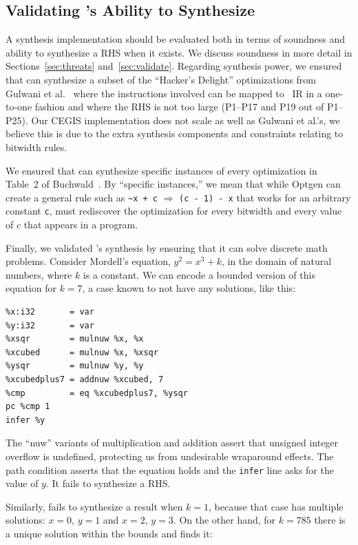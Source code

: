 \subsection{Validating \tool's Ability to Synthesize}

A synthesis implementation should be evaluated both in terms of
soundness and ability to synthesize a RHS when it exists.
%
We discuss soundness in more detail in Sections~\ref{sec:threats}
and~\ref{sec:validate}.
%
Regarding synthesis power, we ensured that \tool{} can synthesize a
subset of the ``Hacker's Delight'' optimizations from Gulwani et
al.~\cite{Gulwani11} where the instructions involved can be mapped to
\tool{}~IR in a one-to-one fashion and where the RHS is not too large
(P1--P17 and P19 out of P1--P25).
%
Our CEGIS implementation does not scale as well as Gulwani et al.'s,
we believe this is due to the extra synthesis components and constraints
relating to bitwidth rules.


We ensured that \tool{} can synthesize specific instances of every
optimization in Table~2 of Buchwald~\cite{Buchwald15}.
%
By ``specific instances,'' we mean that while Optgen can create a
general rule such as \texttt{\textasciitilde x + c} $\Rightarrow$ \texttt{(c - 1) - x}
that works for an arbitrary constant \texttt{c}, \tool{} must
rediscover the optimization for every bitwidth and every value of $c$
that appears in a program.


Finally, we validated \tool{}'s synthesis by ensuring that it can
solve discrete math problems.
%
Consider Mordell's equation, $y^2 = x^3 + k$, in the domain of natural numbers,
where $k$ is a constant.
%
We can encode a bounded version of this equation for $k = 7$, a case known
to not have any solutions, like this:
%
{\small\begin{verbatim}
%x:i32       = var
%y:i32       = var
%xsqr        = mulnuw %x, %x
%xcubed      = mulnuw %x, %xsqr
%ysqr        = mulnuw %y, %y
%xcubedplus7 = addnuw %xcubed, 7
%cmp         = eq %xcubedplus7, %ysqr
pc %cmp 1
infer %y
\end{verbatim}}

The ``nuw'' variants of multiplication and addition assert that unsigned integer
overflow is undefined, protecting us from undesirable wraparound effects.
%
The path condition asserts that the equation holds and the \texttt{infer} line
asks \tool{} for the value of $y$.
%
It fails to synthesize a RHS\@.


Similarly, \tool{} fails to synthesize a result when $k = 1$, because that case
has multiple solutions: $x=0$, $y=1$ and $x=2$, $y=3$.
%
On the other hand, for $k = 785$ there is a unique solution within the
bounds and \tool{} finds it:

